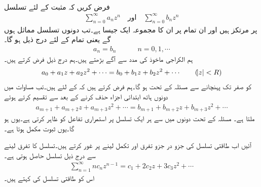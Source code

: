 \quad {}\\
فرض کریں کہ مثبت  کے لئے تسلسل
\begin{align*}
\sum\limits_{n=0}^{\infty} a_n z^n \quad \text{اور}\quad \sum\limits_{n=0}^{\infty} b_n z^n
\end{align*}
 پر مرتکز ہیں اور ان تمام  پر ان کا مجموعہ ایک جیسا ہے۔تب دونوں تسلسل مماثل ہوں گے یعنی تمام  کے لئے درج ذیل ہو گا۔
\begin{align}
a_n=b_n\quad \quad \quad n=0,1,\cdots
\end{align}
\quad
ہم الکراجی ماخوذ کی مدد سے آگے بڑھتے ہیں۔ہم درج ذیل فرض کرتے ہیں۔
\begin{align}\label{مساوات_ٹیلر_مسئلہ_مماثلت_الف}
a_0+a_1z+a_2z^2+\cdots=b_0+b_1z+b_2z^2+\cdots\quad \quad (\abs{z}<R)
\end{align}
 کو صفر تک پہنچانے سے مسئلہ  کے تحت  ہو گا۔ہم فرض کرتے ہیں کہ  کے لئے  ہیں۔تب مساوات  میں دونوں ہاتھ ابتدائی  اجزاء حذف کرنے کے بعد  سے تقسیم کرتے ہوئے
\begin{align*}
a_{m+1}+a_{m+2}z+a_{m+3}z^2+\cdots=b_{m+1}+b_{m+2}z+b_{m+3}z^2+\cdots
\end{align*}
ملتا ہے۔ مسئلہ  کے تحت دونوں میں سے ہر ایک تسلسل  پر استمراری تفاعل کو ظاہر کرتی ہے۔یوں  ہو گا۔یوں ثبوت مکمل ہوتا ہے۔

آئیں اب طاقتی تسلسل کی جزو در جزو تفرق اور تکمل لینے پر غور کرتے ہیں۔تسلسل  کا تفرق لینے سے درج ذیل تسلسل حاصل ہوتی ہے۔
\begin{align}\label{مساوات_ٹیلر_تفرقی_تسلسل}
\sum\limits_{n=1}^{\infty} nc_nz^{n-1}=c_1+2c_2z+3c_3z^2+\cdots
\end{align}
اس کو طاقتی تسلسل کی  کہتے ہیں۔

